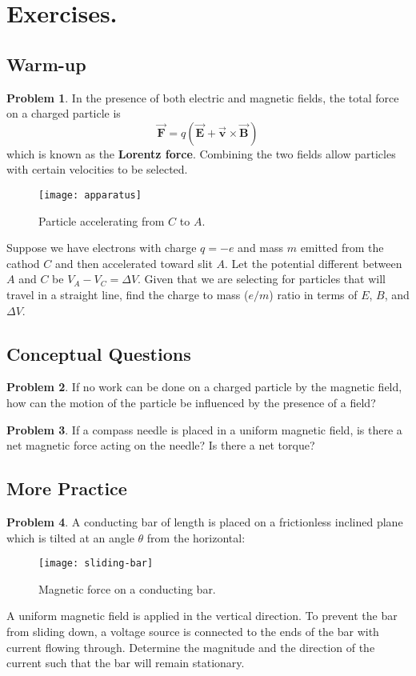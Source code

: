 \documentclass[11pt, letterpaper]{article}
\theoremstyle{definition}
\theoremstyle{remark}
\newcommand{\bv}[2][]{\bm{\vec{#2}_{#1}}}
\begin{document}
\section{Exercises.}
\subsection{Warm-up} %
\textbf{Problem 1}. In the presence of both electric and magnetic fields, the total force on a charged particle is \[\bv{F} = q(\bv{E} + \bv{v}\times\bv{B})\] which is known as the \textbf{Lorentz force}. Combining the two fields allow particles with certain velocities to be selected. 
\begin{figure}[h!]
	\centering
	\texttt{[image: apparatus]}
	\caption{Particle accelerating from $C$ to $A$.}
	\label{fig:apparatus}
\end{figure}

Suppose we have electrons with charge $q = -e$ and mass $m$ emitted from the cathod $C$ and then accelerated toward slit $A$. Let the potential different between $A$ and $C$ be $V_A - V_C = \Delta V$. Given that we are selecting for particles that will travel in a straight line, find the charge to mass ($e/m$) ratio in terms of $E$, $B$, and $\Delta V$.
\subsection{Conceptual Questions} %
\textbf{Problem 2}.  If no work can be done on a charged particle by the magnetic field, how can the motion of the particle be influenced by the presence of a field?

\textbf{Problem 3}.  If a compass needle is placed in a uniform magnetic field, is there a net magnetic force acting on the needle? Is there a net torque?

\subsection{More Practice} %
\textbf{Problem 4}. A conducting bar of length is placed on a frictionless inclined plane which is tilted at an angle $\theta$ from the horizontal:
\begin{figure}[h!]
	\centering
	\texttt{[image: sliding-bar]}
	\caption{Magnetic force on a conducting bar.}
	\label{fig:bar}
\end{figure}

A uniform magnetic field is applied in the vertical direction. To prevent the bar from
sliding down, a voltage source is connected to the ends of the bar with current flowing
through. Determine the magnitude and the direction of the current such that the bar will
remain stationary.
\end{document}
